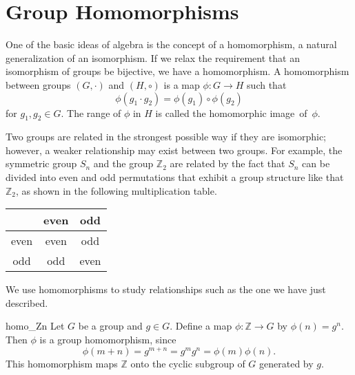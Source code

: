 
 
\section{Group Homomorphisms}
 
 
One of the basic ideas of algebra is the concept of a homomorphism, a
natural generalization of an isomorphism. If we relax the requirement
that an isomorphism of groups be bijective, we have a homomorphism.  A
{\bfi homomorphism\/} between groups $(G, \cdot)$ and $(H, \circ)$ is a map $\phi :
G \rightarrow H$ such that  
\[
\phi( g_1 \cdot g_2 ) = \phi( g_1 ) \circ \phi( g_2 )
\]
for $g_1, g_2 \in G$. The range of $\phi$ in $H$ is called the {\bfi
homomorphic image\/}~of~$\phi$.
 
 
Two groups are related in the strongest possible way if they are
isomorphic; however, a weaker relationship may exist between two
groups.  For example, the symmetric group $S_n$ and the group ${\mathbb
Z}_2$ are related by the fact that $S_n$ can be divided into even and
odd permutations that exhibit a group structure like that ${\mathbb
Z}_2$, as shown in the following multiplication table. 
\begin{center}
\begin{tabular}{c|cc}
            & even & odd \\
\hline
even & even & odd \\
odd  & odd  & even
\end{tabular}
\end{center}
We use homomorphisms to study relationships such as the one we have
just described.
 
 
\begin{example}{homo_Zn}
Let $G$ be a group and $g \in G$. Define a map $\phi : {\mathbb Z}
\rightarrow G$ by $\phi( n ) = g^n$. Then $\phi$ is a group
homomorphism, since 
\[
\phi( m + n ) = g^{ m + n} = g^m g^n = \phi( m ) \phi( n ).
\]
This homomorphism maps ${\mathbb Z}$ onto the cyclic subgroup of $G$
generated by $g$. 
\mbox{\hspace*{1in}}
\end{example}
 
